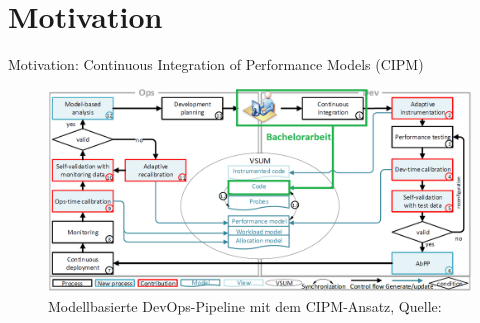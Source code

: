 \documentclass[18pt]{beamer}
\begin{document}
\section{Motivation}
\begin{frame}{Motivation: Continuous Integration of
Performance Models (CIPM)}
\begin{figure}
\includegraphics[scale=0.3]{pictures/CIPM in DevOps unser Teil markiert.png}
\caption{Modellbasierte DevOps-Pipeline mit dem CIPM-Ansatz, Quelle: \textcite{mazkatli2020}}
\end{figure}
\end{frame}


\end{document}

